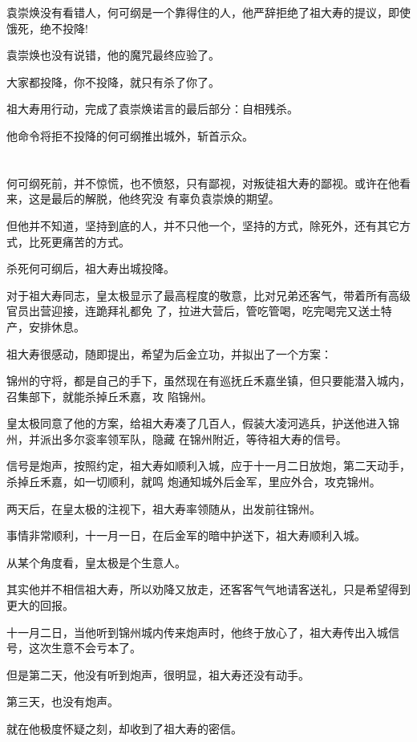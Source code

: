 \documentclass[11pt,a4paper,onecolumn]{article}
\begin{document}
袁崇焕没有看错人，何可纲是一个靠得住的人，他严辞拒绝了祖大寿的提议，即使饿死，绝不投降!

袁崇焕也没有说错，他的魔咒最终应验了。

大家都投降，你不投降，就只有杀了你了。

祖大寿用行动，完成了袁崇焕诺言的最后部分：自相残杀。

他命令将拒不投降的何可纲推出城外，斩首示众。

\section[\thesection]{}

何可纲死前，并不惊慌，也不愤怒，只有鄙视，对叛徒祖大寿的鄙视。或许在他看来，这是最后的解脱，他终究没
有辜负袁崇焕的期望。

但他并不知道，坚持到底的人，并不只他一个，坚持的方式，除死外，还有其它方式，比死更痛苦的方式。

杀死何可纲后，祖大寿出城投降。

对于祖大寿同志，皇太极显示了最高程度的敬意，比对兄弟还客气，带着所有高级官员出营迎接，连跪拜礼都免
了，拉进大营后，管吃管喝，吃完喝完又送土特产，安排休息。

祖大寿很感动，随即提出，希望为后金立功，并拟出了一个方案：

锦州的守将，都是自己的手下，虽然现在有巡抚丘禾嘉坐镇，但只要能潜入城内，召集部下，就能杀掉丘禾嘉，攻
陷锦州。

皇太极同意了他的方案，给祖大寿凑了几百人，假装大凌河逃兵，护送他进入锦州，并派出多尔衮率领军队，隐藏
在锦州附近，等待祖大寿的信号。

信号是炮声，按照约定，祖大寿如顺利入城，应于十一月二日放炮，第二天动手，杀掉丘禾嘉，如一切顺利，就鸣
炮通知城外后金军，里应外合，攻克锦州。

两天后，在皇太极的注视下，祖大寿率领随从，出发前往锦州。

事情非常顺利，十一月一日，在后金军的暗中护送下，祖大寿顺利入城。

从某个角度看，皇太极是个生意人。

其实他并不相信祖大寿，所以劝降又放走，还客客气气地请客送礼，只是希望得到更大的回报。

十一月二日，当他听到锦州城内传来炮声时，他终于放心了，祖大寿传出入城信号，这次生意不会亏本了。

但是第二天，他没有听到炮声，很明显，祖大寿还没有动手。

第三天，也没有炮声。

就在他极度怀疑之刻，却收到了祖大寿的密信。
\end{document}
